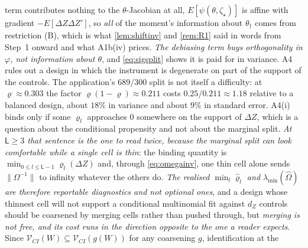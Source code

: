 term contributes nothing to the $\theta$-Jacobian at all, $E[\psi(\theta,\zeta_\star)]$ is affine with
gradient $-E[\Delta Z\Delta Z']$, so \emph{all} of the moment's information about $\theta_\dagger$
comes from restriction (B), which is what \cref{lem:shiftinv} and \cref{rem:R1} said in words from Step~1
onward and what A1b(iv) prices. \emph{The debiasing term buys orthogonality in $\varphi$, not information
about $\theta$}, and \eqref{eq:sigsplit} shows it is paid for in variance. A4 rules out a design in which
the instrument is degenerate on part of the support of the controls.
The application's $689/300$ split is not itself a difficulty: at $\varrho\approx0.303$ the
factor $\varrho(1-\varrho)\approx0.211$ costs $0.25/0.211\approx1.18$ relative to a balanced design, 
about $18\%$ in variance and about $9\%$ in standard error. A4(i) binds only if some
$\varrho_l$ approaches $0$
somewhere on the support of $\Delta Z$, which is a question about the conditional propensity and
not about the marginal split. \emph{At $\mathsf L\ge3$ that sentence is the one to read twice, because
the marginal split can look comfortable while a single cell is thin}: the binding quantity is
$\min_{0\le l\le\mathsf L-1}\varrho_l(\Delta Z)$ and, through \eqref{eq:omegainv}, one thin cell alone
sends $\|\Omega^{-1}\|$ to infinity whatever the others do. \emph{The realised
$\min_l\hat\varrho_l$ and $\lambda_{\min}(\hat\Omega)$ are therefore reportable diagnostics and not
optional ones}, and a design whose thinnest cell will not support a conditional multinomial fit against
$d_Z$ controls should be coarsened by merging cells rather than pushed through, but \emph{merging is not free,
and its cost runs in the direction opposite to the one a reader expects}. Since
$\mathcal V_{CI}(W)\subseteq\mathcal V_{CI}(g(W))$ for any coarsening $g$, identification at the
